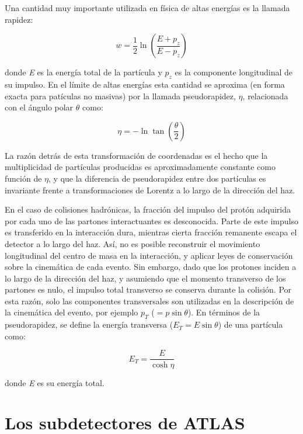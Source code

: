 Una cantidad muy importante utilizada en física de altas energías es la llamada rapidez:

\begin{equation}
w=\frac{1}{2}\ln\left( \frac{E+p_{z}}{E-p_{z}}\right)
\end{equation}

donde \textit{E} es la energía total de la partícula y $p_{z}$ es la componente longitudinal de su impulso. En el límite de altas energías esta cantidad se aproxima (en forma exacta para patículas no masivas) por la llamada pseudorapidez, $\eta$, relacionada con el ángulo polar $\theta$ como:

\begin{equation}
\eta =-\ln \tan\left( \frac{\theta}{2} \right)
\end{equation}

La razón detrás de esta transformación de coordenadas es el hecho que la multiplicidad de partículas producidas es aproximadamente constante como función de $\eta$, y que la diferencia de pseudorapidez entre dos partículas es invariante frente a transformaciones de Lorentz a lo largo de la dirección del haz. 

En el caso de colisiones hadrónicas, la fracción del impulso del protón adquirida por cada uno de las partones interactuantes es desconocida. Parte de este impulso es transferido en la interacción dura, mientras cierta fracción remanente escapa el detector a lo largo del haz. Así, no es posible reconstruir el movimiento longitudinal del centro de masa en la interacción, y aplicar leyes de conservación sobre la cinemática de cada evento. Sin embargo, dado que los protones inciden a lo largo de la dirección del haz, y asumiendo que el momento transverso de los partones es nulo, el impulso total transverso se conserva durante la colisión. Por esta razón, solo las componentes transversales son utilizadas en la descripción de la cinemática del evento, por ejemplo $p_{T}$ ($=p\sin\theta$). En términos de la pseudorapidez, se define la energía transversa ($E_{T}=E\sin\theta$) de una partícula como:

\begin{equation}
E_{T}=\frac{E}{\cosh \eta}
\end{equation}

donde \textit{E} es su energía total.

\section{Los subdetectores de ATLAS}

